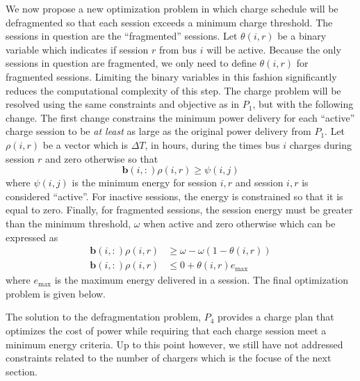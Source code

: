 \par We now propose a new optimization problem in which charge schedule will be defragmented so that each session exceeds a minimum charge threshold. The sessions in question are the ``fragmented'' sessions.  Let $\theta(i,r)$ be a binary variable which indicates if session $r$ from bus $i$ will be active. Because the only sessions in question are fragmented, we only need to define $\theta(i,r)$ for fragmented sessions. Limiting the binary variables in this fashion significantly reduces the computational complexity of this step.  The charge problem will be resolved using the same constraints and objective as in $P_1$, but with the following change. The first change constrains the minimum power delivery for each ``active'' charge session to be {\it at least} as large as the original power delivery from $P_1$. Let $\rho(i,r)$ be a vector which is $\Delta T$, in hours, during the times bus $i$ charges during session $r$ and zero otherwise so that  
\begin{equation}\label{eqn:defragmentation:active}
	\mathbf{b}(i,:)\rho(i,r) \ge \psi(i,j)
\end{equation}
where $\psi(i,j)$ is the minimum energy for session $i,r$ and session $i,r$ is considered ``active''. For inactive sessions, the energy is constrained so that it is equal to zero. Finally, for fragmented sessions, the session energy must be greater than the minimum threshold, $\omega$ when active and zero otherwise which can be expressed as
\begin{equation}\label{eqn:defragmentation:fragmented}\begin{aligned}
	\mathbf{b}(i,:)\rho(i,r) &\ge \omega - \omega(1 - \theta(i,r)) \\
	\mathbf{b}(i,:)\rho(i,r) &\le 0 + \theta(i,r)e_{\text{max}}
\end{aligned}\end{equation}
where $e_{\text{max}}$ is the maximum energy delivered in a session.  The final optimization problem is given below.\\[0.1in]

\par The solution to the defragmentation problem, $P_4$ provides a charge plan that optimizes the cost of power while requiring that each charge session meet a minimum energy criteria. Up to this point however, we still have not addressed constraints related to the number of chargers which is the focuse of the next section.
